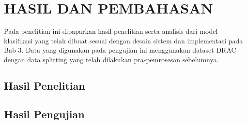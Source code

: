 \chapter{HASIL DAN PEMBAHASAN}
Pada penelitian ini dipaparkan hasil penelitian serta analisis dari model klasifikasi yang telah dibuat sesuai dengan desain sistem dan implementasi pada Bab 3. Data yang digunakan pada pengujian ini menggunakan dataset DRAC dengan data splitting yang telah dilakukan pra-pemrosesan sebelumnya.
\section{Hasil Penelitian}

\section{Hasil Pengujian}
